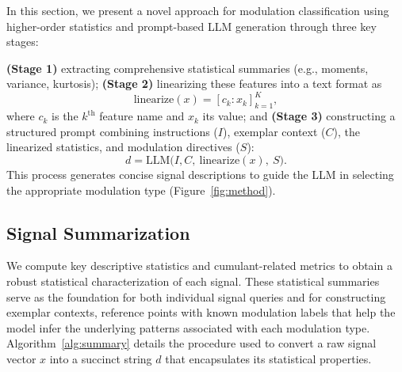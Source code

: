 In this section, we present a novel approach for modulation classification using higher-order statistics and prompt-based LLM generation through three key stages:

\textbf{(Stage 1)} extracting comprehensive statistical summaries (e.g., moments, variance, kurtosis); \textbf{(Stage 2)} linearizing these features into a text format \cite{wang2023meditab} as
\begin{equation} \text{linearize}(x) = {[c_{k}: x_{k}]}_{k=1}^{K}, \end{equation}
where $c_k$ is the $k^{\mathrm{th}}$ feature name and $x_k$ its value; and \textbf{(Stage 3)} constructing a structured prompt combining instructions ($I$), exemplar context ($C$), the linearized statistics, and modulation directives ($S$):
\begin{equation} d = \text{LLM}\bigl(I, C,\ \text{linearize}(x),\ S\bigr). \end{equation}
This process generates concise signal descriptions to guide the LLM in selecting the appropriate modulation type (Figure~\ref{fig:method}).


\subsection{Signal Summarization}
We compute key descriptive statistics and cumulant-related metrics to obtain a robust statistical characterization of each signal. These statistical summaries serve as the foundation for both individual signal queries and for constructing exemplar contexts, reference points with known modulation labels that help the model infer the underlying patterns associated with each modulation type. Algorithm~\ref{alg:summary} details the procedure used to convert a raw signal vector $x$ into a succinct string $d$ that encapsulates its statistical properties.

